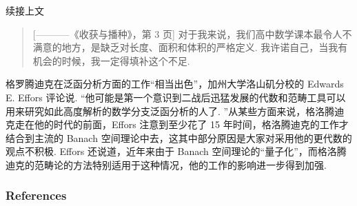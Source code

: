 \documentclass[10pt,aspectratio=169,english,fontset=none]{beamer}
\begin{document}
\begin{frame}[fragile]{续接上文}
  \begin{quotation}[-----------《收获与播种》，第 3 页]
      对于我来说，我们高中数学课本最令人不满意的地方，是缺乏对长度、面积和体积的严格定义. 我许诺自己，当我有机会的时候，我一定得填补这个不足. 
  \end{quotation}
  格罗腾迪克在泛函分析方面的工作“相当出色”，加州大学洛山矶分校的 Edwards E. Effors 评论说. “他可能是第一个意识到二战后迅猛发展的代数和范畴工具可以用来研究如此高度解析的数学分支泛函分析的人了. ”从某些方面来说，格洛腾迪克走在他的时代的前面，Effors 注意到至少花了 15 年时间，格洛腾迪克的工作才结合到主流的 Banach 空间理论中去，这其中部分原因是大家对采用他的更代数的观点不积极. Effors 还说道，近年来由于 Banach 空间理论的“量子化”，而格洛腾迪克的范畴论的方法特别适用于这种情况，他的工作的影响进一步得到加强. 
\end{frame}
  



\begin{frame}
  \frametitle{References}

  \printbibliography

\end{frame}


\end{document}
